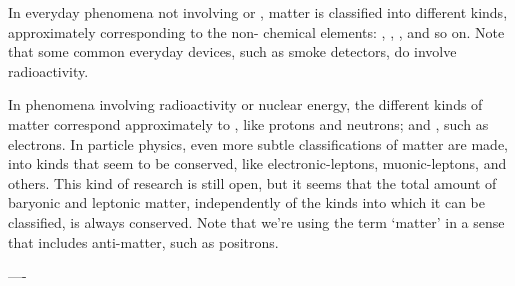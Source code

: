 In everyday phenomena not involving 
or ,
matter is classified into different kinds, approximately corresponding to the non- chemical elements: , , , and so on. %
Note that some common everyday devices, such as smoke detectors, do involve radioactivity.

In phenomena involving radioactivity or nuclear energy, the different kinds of matter correspond approximately to ,
like protons and neutrons; and ,
such as electrons. In particle physics, even more subtle classifications of matter are made, into kinds that seem to be conserved, like electronic-leptons, muonic-leptons, and others. This kind of research is still open, but it seems that the total amount of baryonic and leptonic matter, independently of the kinds into which it can be classified, is always conserved. Note that we're using the term \enquote*{matter} in a sense that includes anti-matter, such as positrons.

----

